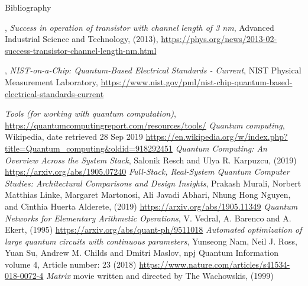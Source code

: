 \begin{frame}[allowframebreaks]{Bibliography}
\begin{thebibliography}{99}
  , %
    \emph{Success in operation of transistor with channel length of 3
      nm}, %
    Advanced Industrial Science and Technology, (2013), %
    \url{https://phys.org/news/2013-02-success-transistor-channel-length-nm.html}

  , %
    \emph{NIST-on-a-Chip: Quantum-Based Electrical Standards - Current}, %
    NIST Physical Measurement Laboratory, %
    \url{https://www.nist.gov/pml/nist-chip-quantum-based-electrical-standards-current}

    
    \emph{Tools (for working with quantum computation)}, %
    \url{https://quantumcomputingreport.com/resources/tools/}
    \emph{Quantum computing}, Wikipedia, date retrieved 28 Sep 2019 %
 \url{https://en.wikipedia.org/w/index.php?title=Quantum_computing&oldid=918292451}
    \emph{Quantum Computing: An Overview Across the System Stack}, %
    Salonik Resch and Ulya R. Karpuzcu, (2019) %
    \url{https://arxiv.org/abs/1905.07240}
    \emph{Full-Stack, Real-System Quantum Computer Studies: Architectural Comparisons and Design Insights}, %
    Prakash Murali, Norbert Matthias Linke, Margaret Martonosi, Ali Javadi Abhari, Nhung Hong Nguyen, and Cinthia Huerta Alderete, %
   (2019) \url{https://arxiv.org/abs/1905.11349}
    \emph{Quantum Networks for Elementary Arithmetic Operations}, %
    V. Vedral, A. Barenco and A. Ekert, (1995) %
    \url{https://arxiv.org/abs/quant-ph/9511018}
    \emph{Automated optimization of large quantum circuits with continuous
      parameters}, %
    Yunseong Nam, Neil J. Ross, Yuan Su, Andrew M. Childs and Dmitri Maslov, %
    npj Quantum Information volume 4, Article number: 23 (2018) %
    \url{https://www.nature.com/articles/s41534-018-0072-4}
    \emph{Matrix} movie written and directed by The Wachowskis, (1999)
  \end{thebibliography}
\end{frame}
